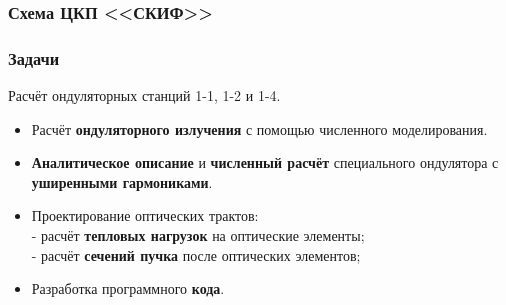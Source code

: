 \documentclass[14pt, hyperref = {colorlinks},xcolor=table ]{beamer}
\begin{document}
\small
\begin{frame}
\frametitle{Схема ЦКП <<СКИФ>>}\label{t1}
\vspace{-10pt}
\begin{figure}[h]
\end{figure}
\end{frame}

\small
\begin{frame}
\frametitle{Задачи}\label{t1}
Расчёт ондуляторных станций 1-1, 1-2 и 1-4.
\begin{center}
\begin{itemize}
	\item Расчёт \textbf{ондуляторного излучения} с помощью численного моделирования. \\
  	\item \textbf{Аналитическое описание} и \textbf{численный расчёт} специального ондулятора с \textbf{уширенными гармониками}. \\
  	\item Проектирование оптических трактов:\\
  	 - расчёт \textbf{тепловых нагрузок} на оптические элементы;\\
  	 - расчёт \textbf{сечений пучка} после оптических элементов;
  	\item Разработка программного \textbf{кода}.
\end{itemize}
\end{center}
\end{frame}
\end{document}
